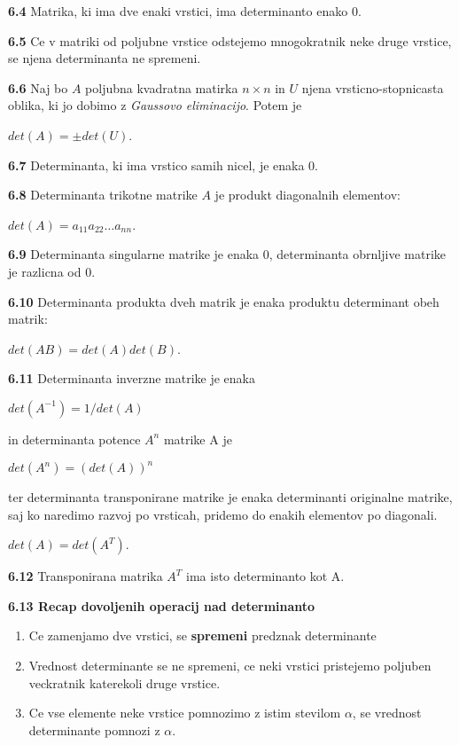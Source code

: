 \documentclass{article}
\begin{document}
\begin{multicols}{4}
\textbf{6.4} Matrika, ki ima dve enaki vrstici, ima determinanto enako 0.

\textbf{6.5} Ce v matriki od poljubne vrstice odstejemo mnogokratnik neke druge vrstice,
se njena determinanta ne spremeni.

\textbf{6.6} Naj bo $A$ poljubna kvadratna matirka $n \times n$ in $U$ njena vrsticno-stopnicasta
oblika, ki jo dobimo z \textit{Gaussovo eliminacijo}. Potem je 
\begin{center}
    $det(A) = \pm det(U)$.
\end{center}

\textbf{6.7} Determinanta, ki ima vrstico samih nicel, je enaka 0.

\textbf{6.8} Determinanta trikotne matrike $A$ je produkt diagonalnih elementov:
\begin{center}
    $det(A) = a_{11}a_{22} \hdots a_{nn}$.
\end{center}

\textbf{6.9} Determinanta singularne matrike je enaka 0, determinanta obrnljive matrike je razlicna od 0.

\textbf{6.10} Determinanta produkta dveh matrik je enaka produktu determinant obeh matrik:
\begin{center}
    $det(AB) = det(A)det(B)$.
\end{center}

\textbf{6.11} Determinanta inverzne matrike je enaka
\begin{center}
    $det(A^{-1}) = 1/det(A)$
\end{center}
in determinanta potence $A^{n}$ matrike A je
\begin{center}
    $det(A^{n}) = (det(A))^{n}$
\end{center}
ter determinanta transponirane matrike je enaka determinanti originalne matrike,
saj ko naredimo razvoj po vrsticah, pridemo do enakih elementov po diagonali.
\begin{center}
    $det(A) = det(A^{T})$.
\end{center}

\textbf{6.12} Transponirana matrika $A^{T}$ ima isto determinanto kot A.

\textbf{6.13 Recap dovoljenih operacij nad determinanto}
\begin{enumerate}
    \item Ce zamenjamo dve vrstici, se \textbf{spremeni} predznak determinante
    \item Vrednost determinante se ne spremeni, ce neki vrstici pristejemo poljuben veckratnik katerekoli druge vrstice.
    \item Ce vse elemente neke vrstice pomnozimo z istim stevilom $\alpha$, se vrednost determinante pomnozi z $\alpha$.
\end{enumerate}


\end{multicols}
\end{document}
